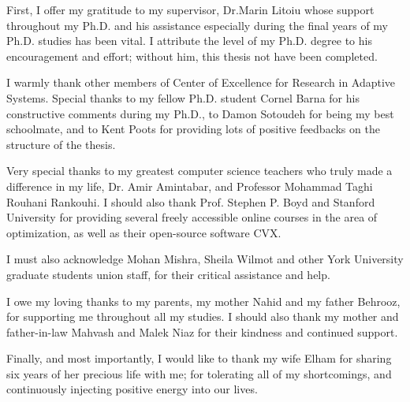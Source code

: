 First, I offer my gratitude to my supervisor, Dr.Marin Litoiu whose support throughout my Ph.D. and his assistance especially during the final years of my Ph.D. studies has been vital. I attribute the level of my Ph.D. degree to his encouragement and effort; without him, this thesis not have been completed.

I warmly thank other members of Center of Excellence for Research in Adaptive Systems. Special thanks to my fellow Ph.D. student Cornel Barna for his constructive comments during my Ph.D., to Damon Sotoudeh for being my best schoolmate, and to Kent Poots for providing lots of positive feedbacks on the structure of the thesis. 

Very special thanks to my greatest computer science teachers who truly made a difference in my life, Dr. Amir Amintabar, and Professor Mohammad Taghi Rouhani Rankouhi. I should also thank Prof. Stephen P. Boyd and Stanford University for providing several freely accessible online courses in the area of optimization, as well as their open-source software CVX.  

I must also acknowledge Mohan Mishra, Sheila Wilmot and other York University graduate students union staff, for their critical assistance and help. 

I owe my loving thanks to my parents, my mother Nahid and my father Behrooz, for supporting me throughout all my studies. I should also thank my mother and father-in-law Mahvash and Malek Niaz for their kindness and continued support.  

Finally, and most importantly, I would like to thank my wife Elham for sharing six years of her precious life with me; for tolerating all of my shortcomings, and continuously injecting positive energy into our lives.  



